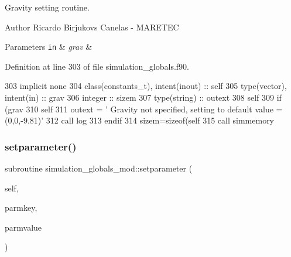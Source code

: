 Gravity setting routine. 

\begin{DoxyAuthor}{Author}
Ricardo Birjukovs Canelas -\/ M\+A\+R\+E\+T\+EC
\end{DoxyAuthor}

\begin{DoxyParams}[1]{Parameters}
\mbox{\tt in}  & {\em grav} & \\
\hline
\end{DoxyParams}


Definition at line 303 of file simulation\+\_\+globals.\+f90.


\begin{DoxyCode}
303     \textcolor{keywordtype}{implicit none}
304     \textcolor{keywordtype}{class}(constants\_t), \textcolor{keywordtype}{intent(inout)} :: self
305     \textcolor{keywordtype}{type}(vector), \textcolor{keywordtype}{intent(in)} :: grav
306     \textcolor{keywordtype}{integer} :: sizem
307     \textcolor{keywordtype}{type}(string) :: outext
308     self%
309     \textcolor{keywordflow}{if} (grav%
310         self%
311         outext = \textcolor{stringliteral}{'       Gravity not specified, setting to default value = (0,0,-9.81)'}
312         \textcolor{keyword}{call }log%
313 \textcolor{keywordflow}{    endif}
314     sizem=sizeof(self%
315     \textcolor{keyword}{call }simmemory%
\end{DoxyCode}
\mbox{\label{namespacesimulation__globals__mod_a8a05831d4c3e3eb5741d65978f6fcf61}} 
\subsubsection{\texorpdfstring{setparameter()}{setparameter()}}
{\footnotesize\ttfamily subroutine simulation\+\_\+globals\+\_\+mod\+::setparameter (\begin{DoxyParamCaption}\item[{class(\mbox{\hyperlink{structsimulation__globals__mod_1_1parameters__t}{parameters\+\_\+t}}), intent(inout)}]{self,  }\item[{type(string), intent(in)}]{parmkey,  }\item[{type(string), intent(in)}]{parmvalue }\end{DoxyParamCaption})\hspace{0.3cm}{\ttfamily [private]}}



